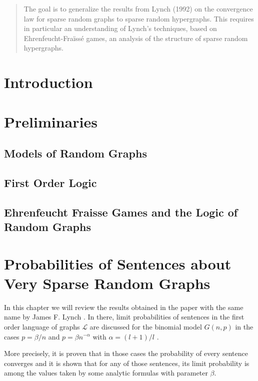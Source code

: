 \documentclass[11pt,notitlepage]{report}
\theoremstyle{definition}
\begin{document}
\begin{abstract}
	The goal is to generalize the results from Lynch (1992) on the convergence law for sparse random graphs to sparse random hypergraphs. This requires in particular an understanding of Lynch's techniques, based on Ehrenfeucht-Fraïssé games, an analysis of the structure of sparse random hypergraphs.
\end{abstract}
\tableofcontents

\chapter*{Introduction}




\chapter{Preliminaries}


\section{Models of Random Graphs}

\section{First Order Logic}

\section{Ehrenfeucht Fraisse Games and the Logic of Random Graphs}



\chapter{Probabilities of Sentences about Very Sparse Random Graphs}


In this chapter we will review the results obtained
 in the paper with the same name by James F. Lynch \cite{lynch1992probabilities}.
In there, limit probabilities of sentences in the first order language of graphs $\mathcal{L}$
are discussed for the binomial model $G(n,p)$ in the cases $p=\beta/n$ and
$p=\beta n^{-\alpha}$ with $\alpha=(l+1)/l$ . \par

More precisely, it is proven that in those cases the 
probability of every sentence converges and it is shown
that for any of those sentences, its limit probability 
is among the values taken by some analytic formulas
with parameter $\beta$. \par
\end{document}
